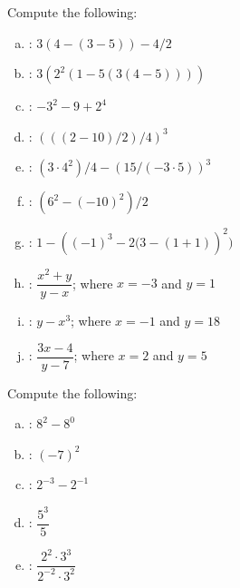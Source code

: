 \documentclass[11pt,letterpaper]{article}
\begin{document}
\newpage





 Compute the following: \pvspace{0.2cm}
\begin{enumerate}[(a)] \itemsep=2ex
\item {}: \qquad $3 \left( 4 - \left(3 - 5 \right) \right) - 4/2$
\item {}: \qquad $3 \left( 2^2 \left( 1 - 5 \left( 3 \left(4 - 5 \right) \right) \right) \right)$
\item {}: \qquad $-3^2 - 9 + 2^4$
\item {}: \qquad $\left( \left( (2 - 10 ) / 2 \right) / 4 \right)^3$
\item {}: \qquad $(3 \cdot 4^2)/4 - \left(15 / \left(-3 \cdot 5 \right) \right)^3$
\item {}: \qquad $\left(6^2 - (-10)^2 \right)/2$
\item {}: \qquad $1 - \left( (-1)^3 - 2(3 - (1 +1) \right)^2 )$
\item {}: \qquad $\dfrac{x^2 + y}{y - x}$; where $x= -3$ and $y= 1$
\item {}: \qquad $y - x^3$; where $x= -1$ and $y= 18$
\item {}: \qquad $\dfrac{3x - 4}{y - 7}$; where $x= 2$ and $y= 5$
\end{enumerate}





\vfill





 Compute the following: \pvspace{0.2cm}
\begin{enumerate}[(a)] \itemsep=2ex
\item {}: \qquad $8^2 - 8^0$
\item {}: \qquad $(-7)^2$
\item {}: \qquad $2^{-3} - 2^{-1}$
\item {}: \qquad $\dfrac{5^3}{5}$
\item {}: \qquad $\dfrac{2^2 \cdot 3^3}{2^{-2} \cdot 3^2}$
\end{enumerate}
\end{document}
